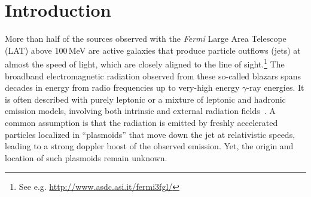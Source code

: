 \documentclass[twocolumn]{aastex62}
\newcommand{\gray}{$\gamma$-ray\xspace}
\newcommand{\Fermi}{\emph{Fermi}\xspace}
\begin{document}
\section{Introduction} \label{sec:intro}

More than half of the sources observed with the \Fermi Large Area Telescope (LAT) above 100\,MeV are active galaxies that produce particle outflows (jets) at almost the speed of light, which are closely aligned to the line of sight.\footnote{See e.g. \url{http://www.asdc.asi.it/fermi3fgl/}}
The broadband electromagnetic radiation observed from these so-called blazars spans decades in energy from radio frequencies up to very-high energy \gray energies. 
It is often described with purely leptonic or a mixture of leptonic and hadronic emission models, involving both intrinsic and external radiation fields~\cite[e.g.,][and references therein]{Madejski:2016oqg}.
A common assumption is that the radiation is emitted by freshly accelerated   particles localized in ``plasmoids''  that move down the jet at relativistic speeds,
 leading to a strong doppler boost of the observed emission. 
Yet, the origin and location of such plasmoids remain unknown. 
\end{document}
